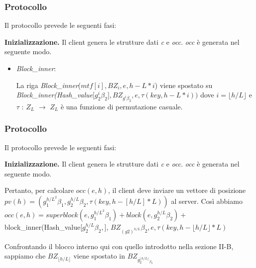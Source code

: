 \documentclass{beamer}
\begin{document}
\begin{frame}
\frametitle{Protocollo}
Il protocollo prevede le seguenti fasi:

\textbf{Inizializzazione.} Il client genera le strutture dati \textit{c} e \textit{occ}. \textit{occ} è generata nel seguente modo.

\begin{itemize}
	\item \textit{Block\_inner}:
	

	La riga \textit{Block\_inner}($mtf[i],BZ_{i}, e, h-L*i$) viene spostato su \textit{Block\_inner}\textit{(Hash\_value}[$g^{i}_{2}\beta_{2}], BZ_{g^{i}{\beta_{2}}}, e, \tau(key, h-L*i))$
	dove $i = \lfloor h/L\rfloor$ e $\tau$ : $Z_{L} $ $\rightarrow$ $Z_{L} $ è una funzione di permutazione casuale.
\end{itemize}
\end{frame}
\begin{frame}
\frametitle{Protocollo}
Il protocollo prevede le seguenti fasi:

\textbf{Inizializzazione.} Il client genera le strutture dati \textit{c} e \textit{occ}. \textit{occ} è generata nel seguente modo.


	
	Pertanto, per calcolare $occ(e, h)$, il client deve inviare un vettore di posizione $pv(h) = (g_{1}^{h/L^{2}} \beta_{1}, g_{2}^{h/L} \beta_{2}, \tau(key, h-[h/L] * L) )$ al server. Così abbiamo $occ(e,h) = superblock(e,g_{1}^{h/L^{2}} \beta_{1}) + block(e,g_{2}^{h/L} \beta_{2}) +$ block\_inner(Hash\_value[$g_{2}^{h/L} \beta_{2},$], $BZ_{(g2)^{h/L}}\beta_{2}, e, \tau(key, h-\lfloor h/L\rfloor * L)$
	
	Confrontando il blocco interno qui con quello introdotto nella sezione
	II-B, sappiamo che $BZ_{\lfloor h/L \rfloor}$ viene spostato in $BZ_{g_{2}^{\lfloor h/L \rfloor}_{\beta_{2}}}$


\end{frame}
\end{document}

